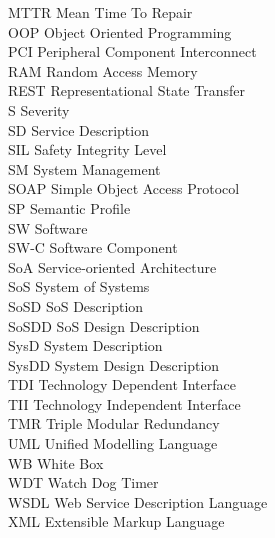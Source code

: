MTTR \tocdotfill Mean Time To Repair\\
OOP \tocdotfill Object Oriented Programming\\
PCI \tocdotfill Peripheral Component Interconnect\\
RAM \tocdotfill Random Access Memory\\
REST \tocdotfill Representational State Transfer\\
S \tocdotfill Severity\\
SD \tocdotfill Service Description\\
SIL \tocdotfill Safety Integrity Level\\
SM \tocdotfill System Management\\
SOAP \tocdotfill Simple Object Access Protocol\\
SP \tocdotfill Semantic Profile\\
SW \tocdotfill Software\\
SW-C \tocdotfill Software Component\\
SoA \tocdotfill Service-oriented Architecture\\
SoS \tocdotfill System of Systems\\
SoSD \tocdotfill SoS Description\\
SoSDD \tocdotfill SoS Design Description\\
SysD \tocdotfill System Description\\
SysDD \tocdotfill System Design Description\\
TDI \tocdotfill Technology Dependent Interface\\
TII \tocdotfill Technology Independent Interface\\
TMR \tocdotfill Triple Modular Redundancy\\
UML \tocdotfill Unified Modelling Language\\
WB \tocdotfill White Box\\
WDT \tocdotfill Watch Dog Timer\\
WSDL \tocdotfill Web Service Description Language\\
XML \tocdotfill Extensible Markup Language\\